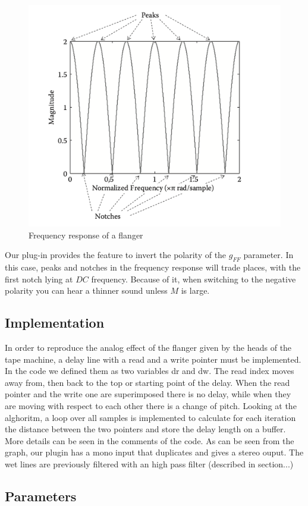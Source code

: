 \begin{figure}
	\centering
	\includegraphics[width=0.5\linewidth]{assets/comb.png}
	\caption{Frequency response of a flanger}
	\label{fig:comb}
\end{figure}

Our plug-in provides the feature to invert the polarity of the $g_{FF}$ parameter. In this case, peaks and notches in the frequency response will trade places, with the first notch lying at $DC$ frequency. Because of it, when switching to the negative polarity you can hear a thinner sound unless $M$ is large.

\subsection{Implementation}\label{sec:implementation}

In order to reproduce the analog effect of the flanger given by the heads of the tape machine, a delay line with a read and a write pointer must be implemented. In the code we defined them as two variables dr and dw. The read index moves away from, then back to the top or starting point of the delay. When the read pointer and the write one are superimposed there is no delay, while when they are moving with respect to each other there is a change of pitch. Looking at the alghoritm, a loop over all samples is implemented to calculate for each iteration the distance between the two pointers and store the delay length on a buffer. More details can be seen in the comments of the code.
As can be seen from the graph, our plugin has a mono input that duplicates and gives a stereo ouput. The wet lines are previously filtered with an high pass filter (described in section...) 

\subsection{Parameters}\label{sec:parameters}

